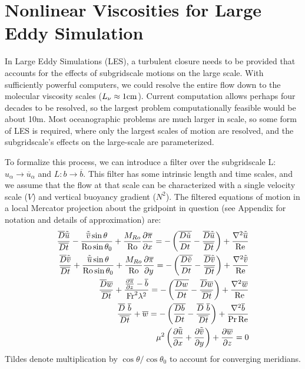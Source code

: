 
\def\del{{\mathbf \nabla}}
\def\av#1{\overline{#1}}
\def\pd#1#2{{\frac{\partial{#2}}{\partial#1}}}
\def\pds#1#2{{\frac{\partial^2{#2}}{{\partial#1}^2}}}
\def\Dt#1{\frac{D{#1}}{Dt}}
\def\aDt#1{\frac{\av D{#1}}{\av{Dt}}}
\def\d#1{{\,\rm d#1}}
\def\Ro{{\rm Ro}}
\def\Re{{\rm Re}}
\def\Fr{{\rm Fr}}
\def\mr{{m_{Ro}}}
\def\Mr{{M_{Ro}}}
\def\eg{{\emph{e.g.,}\ }}
\def\ie{{\emph{i.e.,}\ }}
\def\tu{{\tilde u}}
\def\tv{{\tilde v}}
\def\atu{{\tilde {\av u}}}
\def\atv{{\tilde {\av v}}}
\def\lesssim{{<\atop\sim}}


\section{Nonlinear Viscosities for Large Eddy Simulation}
\label{sect:nonlin-visc}

In Large Eddy Simulations (LES), a turbulent closure needs to be
provided that accounts for the effects of subgridscale motions on the
large scale.  With sufficiently powerful computers, we could resolve
the entire flow down to the molecular viscosity scales
{($L_{\nu}\approx 1 \rm cm$)}.  Current computation allows perhaps
four decades to be resolved, so the largest problem computationally
feasible would be about 10m. Most oceanographic problems are much
larger in scale, so some form of LES is required, where only the
largest scales of motion are resolved, and the subgridscale's effects
on the large-scale are parameterized.

To formalize this process, we can introduce a filter over the
subgridscale L: $u_\alpha\rightarrow \av u_\alpha$ and $L:
b\rightarrow \av b$.  This filter has some intrinsic length and time
scales, and we assume that the flow at that scale can be characterized
with a single velocity scale ($V$) and vertical buoyancy gradient
($N^2$). The filtered equations of motion in a local Mercator
projection about the gridpoint in question (see Appendix for notation
and details of approximation) are: \newpage
\begin{eqnarray}
\aDt \atu- \frac{\atv \sin\theta}{\Ro\sin\theta_0}+\frac{\Mr}{\Ro}\pd{x}{\av\pi}=-\left({\av{\Dt \tu}}-{\aDt \atu}\right)+\frac{\nabla^2{\atu}}{\Re}\label{eq:mercat}\\
\aDt\atv+ \frac{\atu\sin\theta}{\Ro\sin\theta_0}+\frac{\Mr}{\Ro}\pd{y}{\av\pi}=-\left({\av{\Dt \tv}}-{\aDt \atv}\right)+\frac{\nabla^2{\atv}}{\Re}\nonumber\\
\aDt {\av w} +\frac{\pd{z}{\av\pi}-\av b}{\Fr^2\lambda^2}=-\left(\av{\Dt w}-\aDt {\av{w}}\right)+\frac{\nabla^2\av w}{\Re}\nonumber\\
\aDt{\ \av b}+\av w=-\left(\av{\Dt{b}}-\aDt{\ \av b} \right)+\frac{\nabla^2 \av b}{\Pr\Re}\nonumber \\
\mu^2\left(\pd x\atu  + \pd y\atv \right)+\pd z {\av w} =0\label{eq:cont}
\end{eqnarray}
Tildes denote multiplication by $\cos\theta/\cos\theta_0$ to account
for converging meridians.

